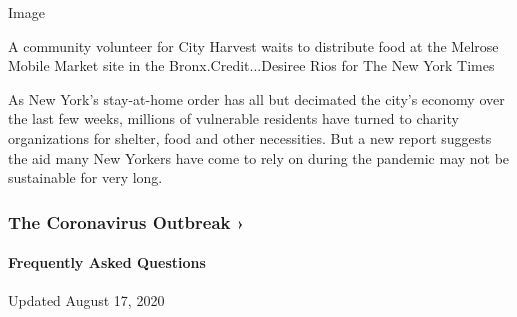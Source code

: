 Image

A community volunteer for City Harvest waits to distribute food at the
Melrose Mobile Market site in the Bronx.Credit...Desiree Rios for The
New York Times

As New York's stay-at-home order has all but decimated the city's
economy over the last few weeks, millions of vulnerable residents have
turned to charity organizations for shelter, food and other necessities.
But a new report suggests the aid many New Yorkers have come to rely on
during the pandemic may not be sustainable for very long.

\href{https://www.nytimes3xbfgragh.onion/news-event/coronavirus?action=click\&pgtype=Article\&state=default\&region=MAIN_CONTENT_3\&context=storylines_faq}{}

\hypertarget{the-coronavirus-outbreak-}{%
\subsubsection{The Coronavirus Outbreak
›}\label{the-coronavirus-outbreak-}}

\hypertarget{frequently-asked-questions}{%
\paragraph{Frequently Asked
Questions}\label{frequently-asked-questions}}

Updated August 17, 2020

